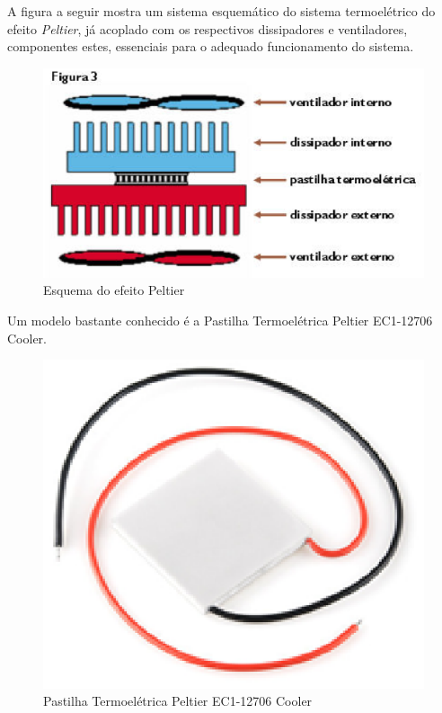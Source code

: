 A figura a seguir mostra um sistema esquemático do sistema termoelétrico do efeito \textit{Peltier}, já acoplado com os respectivos dissipadores e ventiladores, componentes estes, essenciais para o adequado funcionamento do sistema.

\begin{figure}[h]
	\centering
	\includegraphics[keepaspectratio=true,scale=0.6]{figuras/peltier.eps}
	\caption{Esquema do efeito Peltier}
	\label{peltier}
\end{figure}

Um modelo bastante conhecido é a Pastilha Termoelétrica Peltier EC1-12706 Cooler.

\begin{figure}[h]
	\centering
	\includegraphics[keepaspectratio=true,scale=0.6]{figuras/cooler.eps}
	\caption{Pastilha Termoelétrica Peltier EC1-12706 Cooler}
	\label{cooler}
\end{figure}

